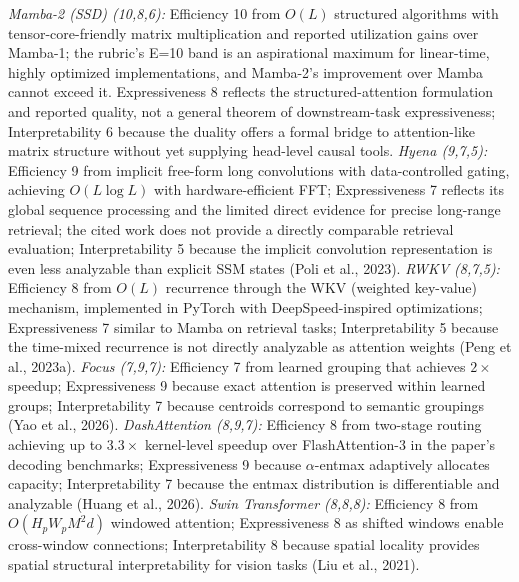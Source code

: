 \documentclass[10pt,twocolumn]{article}
\begin{document}
\textit{Mamba-2 (SSD) (10,8,6):} Efficiency 10 from $O(L)$ structured algorithms with tensor-core-friendly matrix multiplication and reported utilization gains over Mamba-1; the rubric's E=10 band is an aspirational maximum for linear-time, highly optimized implementations, and Mamba-2's improvement over Mamba cannot exceed it. Expressiveness 8 reflects the structured-attention formulation and reported quality, not a general theorem of downstream-task expressiveness; Interpretability 6 because the duality offers a formal bridge to attention-like matrix structure without yet supplying head-level causal tools.
\textit{Hyena (9,7,5):} Efficiency 9 from implicit free-form long convolutions with data-controlled gating, achieving $O(L \log L)$ with hardware-efficient FFT; Expressiveness 7 reflects its global sequence processing and the limited direct evidence for precise long-range retrieval; the cited work does not provide a directly comparable retrieval evaluation; Interpretability 5 because the implicit convolution representation is even less analyzable than explicit SSM states (Poli et al., 2023).
\textit{RWKV (8,7,5):} Efficiency 8 from $O(L)$ recurrence through the WKV (weighted key-value) mechanism, implemented in PyTorch with DeepSpeed-inspired optimizations; Expressiveness 7 similar to Mamba on retrieval tasks; Interpretability 5 because the time-mixed recurrence is not directly analyzable as attention weights (Peng et al., 2023a).
\textit{Focus (7,9,7):} Efficiency 7 from learned grouping that achieves $2\times$ speedup; Expressiveness 9 because exact attention is preserved within learned groups; Interpretability 7 because centroids correspond to semantic groupings (Yao et al., 2026).
\textit{DashAttention (8,9,7):} Efficiency 8 from two-stage routing achieving up to $3.3\times$ kernel-level speedup over FlashAttention-3 in the paper's decoding benchmarks; Expressiveness 9 because $\alpha$-entmax adaptively allocates capacity; Interpretability 7 because the entmax distribution is differentiable and analyzable (Huang et al., 2026).
\textit{Swin Transformer (8,8,8):} Efficiency 8 from $O(H_pW_pM^2d)$ windowed attention; Expressiveness 8 as shifted windows enable cross-window connections; Interpretability 8 because spatial locality provides spatial structural interpretability for vision tasks (Liu et al., 2021).
\end{document}
